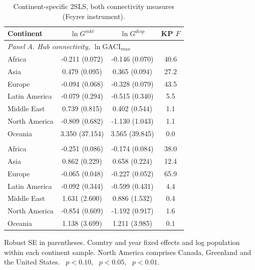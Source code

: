 \begin{table}[H]\centering\caption{Continent-specific 2SLS, both connectivity measures (Feyrer instrument).}\label{tab:a_continent}
\begin{threeparttable}\small\begin{tabular}{lccc}
\toprule
Continent & $\ln G^{mkt}$ & $\ln G^{disp}$ & KP $F$ \\
\midrule
\multicolumn{4}{l}{\emph{Panel A. Hub connectivity, $\ln\mathrm{GACI}_{max}$}}\\
Africa & -0.211\sym{***} (0.072) & -0.146\sym{**} (0.070) & 40.6 \\
Asia & 0.479\sym{***} (0.095) & 0.365\sym{***} (0.094) & 27.2 \\
Europe & -0.094 (0.068) & -0.328\sym{***} (0.079) & 43.5 \\
Latin America & -0.079 (0.294) & -0.515 (0.340) & 5.5 \\
Middle East & 0.739 (0.815) & 0.402 (0.544) & 1.1 \\
North America & -0.809 (0.682) & -1.130 (1.043) & 1.1 \\
Oceania & 3.350 (37.154) & 3.565 (39.845) & 0.0 \\
\addlinespace
\multicolumn{4}{l}{\emph{Panel B. Hub quality, $\ln\mathrm{GACI}_{cwm}$}}\\
Africa & -0.251\sym{***} (0.086) & -0.174\sym{**} (0.084) & 38.0 \\
Asia & 0.862\sym{***} (0.229) & 0.658\sym{***} (0.224) & 12.4 \\
Europe & -0.065 (0.048) & -0.227\sym{***} (0.052) & 65.9 \\
Latin America & -0.092 (0.344) & -0.599 (0.431) & 4.4 \\
Middle East & 1.631 (2.600) & 0.886 (1.532) & 0.4 \\
North America & -0.854 (0.609) & -1.192 (0.917) & 1.6 \\
Oceania & 1.138 (3.699) & 1.211 (3.985) & 0.1 \\
\bottomrule
\end{tabular}
\begin{tablenotes}\footnotesize\item Robust SE in parentheses. Country and year fixed effects and log population within each continent sample. North America comprises Canada, Greenland and the United States. \sym{*}~$p<0.10$, \sym{**}~$p<0.05$, \sym{***}~$p<0.01$.\end{tablenotes}\end{threeparttable}\end{table}

